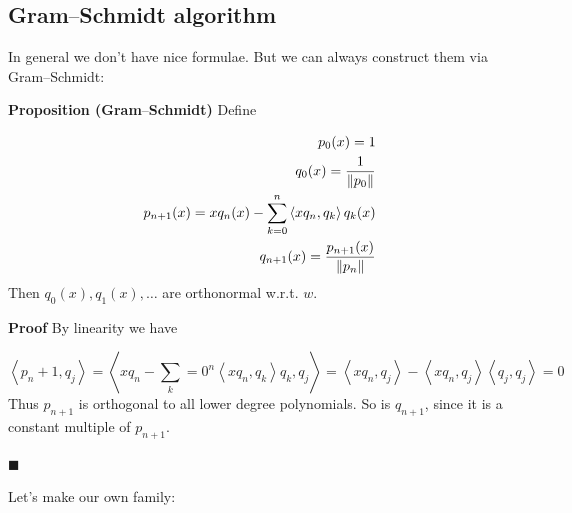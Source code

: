 \documentclass[12pt,a4paper]{article}
\def\ip<#1>{\left\langle{#1}\right\rangle}
\def\norm#1{\left\| #1 \right\|}
\def\endash{–}
\begin{document}
\subsection{Gram\ensuremath{\endash}Schmidt algorithm}
In general we don't have nice formulae. But we can always construct them via Gram\ensuremath{\endash}Schmidt:

\textbf{Proposition (Gram\ensuremath{\endash}Schmidt)} Define


\begin{align*}
p_0(x) = 1 \\
q_0(x) = {1 \over \norm{p_0}}\\
p_{n+1}(x) = x q_n(x) - \sum_{k=0}^n \ip<x q_n, q_k> q_k(x)\\
q_{n+1}(x) = {p_{n+1}(x) \over \norm{p_n}}
\end{align*}
Then $q_0(x), q_1(x), \ldots$ are orthonormal w.r.t. $w$.

\textbf{Proof} By linearity we have

\[
\ip<p_{n+1}, q_j> = \ip<x q_n - \sum_{k=0}^n {\ip<x q_n, q_k>} q_k, q_j> = \ip<x q_n, q_j> - \ip<x q_n, q_j> \ip<q_j,q_j> = 0
\]
Thus $p_{n+1}$ is orthogonal to all lower degree polynomials. So is $q_{n+1}$, since it is a constant multiple of $p_{n+1}$.

\ensuremath{\blacksquare}

Let's make our own family:
\end{document}
